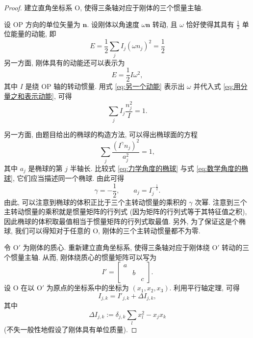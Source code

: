 \documentclass{article}
\begin{document}
\begin{proof}
建立直角坐标系 $\mathrm O$, 使得三条轴对应于刚体的三个惯量主轴.

设 OP 方向的单位矢量为 $\mathbf n$.
设刚体以角速度 $\omega\mathbf n$ 转动,
且 $\omega$ 恰好使得其具有 $\frac12$ 单位能量的动能,
即
\begin{equation}
	\label{eq:用分量之和表示动能}
	E=\frac12\sum_jI_j\left(\omega n_j\right)^2=\frac12
\end{equation}
另一方面, 刚体具有的动能还可以表示为
\begin{equation}
	\label{eq:另一个动能}
	E=\frac12I\omega^2,
\end{equation}
其中 $I$ 是绕 OP 轴的转动惯量.
用式 \ref{eq:另一个动能} 表示出 $\omega$ 并代入式 \ref{eq:用分量之和表示动能},
可得
\begin{equation}
	\label{eq:力学角度的椭球}
	\sum_jI_j\frac{n_j^2}I=1.
\end{equation}

另一方面, 由题目给出的椭球的构造方法, 可以得出椭球面的方程
\begin{equation}
	\label{eq:数学角度的椭球}
	\sum_j\frac{\left(I^\gamma n_j\right)^2}{a_j^2}=1,
\end{equation}
其中 $a_j$ 是椭球的第 $j$ 半轴长.
比较式 \ref{eq:力学角度的椭球} 与式 \ref{eq:数学角度的椭球},
它们应当描述同一个椭球.
由此可得
\begin{equation}
	\gamma=-\frac12,\qquad a_j=I_j^{-\frac12}.
\end{equation}
由此, 可以注意到椭球的体积正比于三个主转动惯量的乘积的 $\gamma$ 次幂.
注意到三个主转动惯量的乘积就是惯量矩阵的行列式 (因为矩阵的行列式等于其特征值之积),
因此椭球的体积取最值相当于惯量矩阵的行列式取最值.
另外, 为了保证这是个椭球, 我们可以得知对于任意的 O, 刚体的三个主转动惯量都不为零.

令 $\mathrm O'$ 为刚体的质心.
重新建立直角坐标系, 使得三条轴对应于刚体绕 $\mathrm O'$ 转动的三个惯量主轴.
从而, 刚体绕质心的惯量矩阵可以写为 
\begin{equation}
	I'=\left[\begin{matrix}a\\&b\\&&c\end{matrix}\right].
\end{equation}
设 $\mathrm O$ 在以 $\mathrm O'$ 为原点的坐标系中的坐标为 $\left(x_1,x_2,x_3\right)$.
利用平行轴定理, 可得
\begin{equation}
	I_{j,k}=I'_{j,k}+\Delta I_{j,k},
\end{equation}
其中
\begin{equation}
	\Delta I_{j,k}:=\delta_{j,k}\sum_lx_l^2-x_jx_k
\end{equation}
(不失一般性地假设了刚体具有单位质量).


\end{proof}
\end{document}
